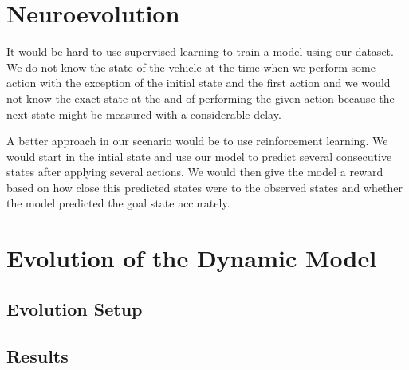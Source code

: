 \section{Neuroevolution}

It would be hard to use supervised learning to train a model using our dataset. We do not know the state of the vehicle at the time when we perform some action with the exception of the initial state and the first action and we would not know the exact state at the and of performing the given action because the next state might be measured with a considerable delay.

A better approach in our scenario would be to use reinforcement learning. We would start in the intial state and use our model to predict several consecutive states after applying several actions. We would then give the model a reward based on how close this predicted states were to the observed states and whether the model predicted the goal state accurately.


\section{Evolution of the Dynamic Model}

\subsection{Evolution Setup}

\subsection{Results}